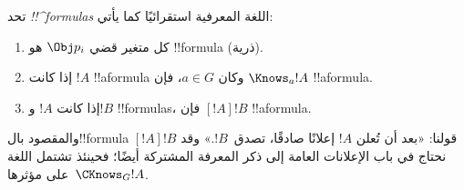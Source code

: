 \documentclass[../../../include/open-logic-section]{subfiles}
\begin{document}
\begin{defn}
  تحد \emph{!!^{formula}s} اللغة المعرفية استقرائيًا كما يأتي:
  \begin{enumerate}


  \item كل متغير قضي $\Obj p_i$ هو !!{formula} (ذرية).






  \item إذا كانت $!A$ !!a{formula} وكان $a \in G$، فإن $\Knows_a !A$
  !!a{formula}.
  
  \item إذا كانت $!A$ و$!B$ !!{formula}s، فإن $[!A] !B$ !!a{formula}.

\end{enumerate}
\end{defn}

والمقصود بال!!{formula} $[!A] !B$ قولنا: «بعد أن تُعلن $!A$ إعلانًا
صادقًا، تصدق~$!B$.» وقد نحتاج في باب الإعلانات العامة إلى ذكر المعرفة
المشتركة أيضًا؛ فحينئذ تشتمل اللغة على مؤثرها~$\CKnows_G !A$.
\end{document}
